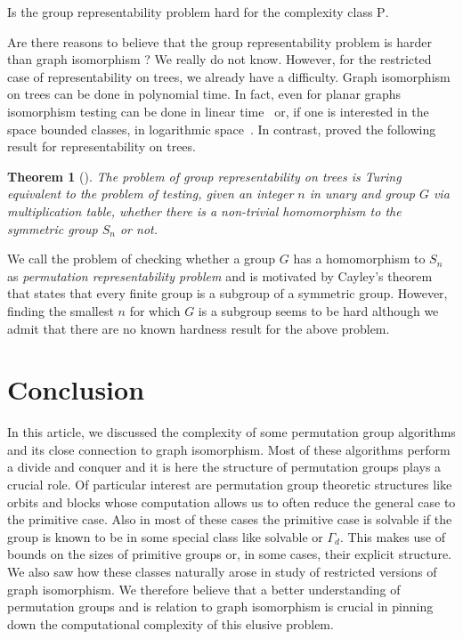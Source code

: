 \documentclass{article}
\newtheorem{theorem}{Theorem}[section]
\begin{document}
\begin{openproblem}
  Is the group representability problem hard for the complexity class
  $\mathrm{P}$.
\end{openproblem}

Are there reasons to believe that the group representability problem
is harder than graph isomorphism ? We really do not know. However, for
the restricted case of representability on trees, we already have a
difficulty. Graph isomorphism on trees can be done in polynomial
time. In fact, even for planar graphs isomorphism testing can be done
in linear time~\cite{hopcroft1974lineartime} or, if one is interested
in the space bounded classes, in logarithmic
space~\cite{dutta2009planar}. In contrast, \citet{kurur09} proved the
following result for representability on trees.

\begin{theorem}[\citeauthor*{kurur09}]
  The problem of group representability on trees is Turing equivalent
  to the problem of testing, given an integer $n$ in unary and group
  $G$ via multiplication table, whether there is a non-trivial
  homomorphism to the symmetric group $S_n$ or not.
\end{theorem}

We call the problem of checking whether a group $G$ has a homomorphism
to $S_n$ as \emph{permutation representability problem} and is
motivated by Cayley's theorem that states that every finite group is a
subgroup of a symmetric group. However, finding the smallest $n$ for
which $G$ is a subgroup seems to be hard although we admit that there
are no known hardness result for the above problem.

\section{Conclusion}

In this article, we discussed the complexity of some permutation group
algorithms and its close connection to graph isomorphism. Most of
these algorithms perform a divide and conquer and it is here the
structure of permutation groups plays a crucial role. Of particular
interest are permutation group theoretic structures like orbits and
blocks whose computation allows us to often reduce the general case to
the primitive case. Also in most of these cases the primitive case is
solvable if the group is known to be in some special class like
solvable or $\Gamma_d$. This makes use of bounds on the sizes of
primitive groups or, in some cases, their explicit structure. We also
saw how these classes naturally arose in study of restricted versions
of graph isomorphism. We therefore believe that a better understanding
of permutation groups and is relation to graph isomorphism is crucial
in pinning down the computational complexity of this elusive problem.



\end{document}
